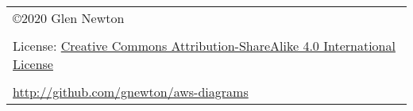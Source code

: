                   \tiny
                  \begin{tabular}{l}
                    \copyright 2020 Glen Newton\\
                    \\
                    License: \href{https://creativecommons.org/licenses/by-sa/4.0/legalcode}{Creative Commons Attribution-ShareAlike 4.0 International License}\\
                    \\
                    \url{http://github.com/gnewton/aws-diagrams} \\
                  \end{tabular}
